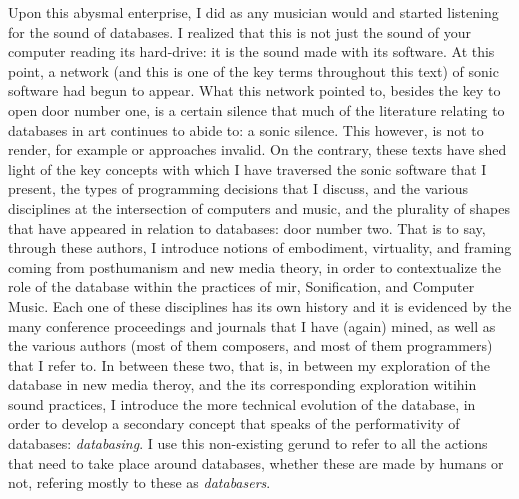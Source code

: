 Upon this abysmal enterprise, I did as any musician would and started listening for the sound of databases. I realized that this is not just the sound of your computer reading its hard-drive: it is the sound made with its software. At this point, a network (and this is one of the key terms throughout this text) of sonic software had begun to appear. What this network pointed to, besides the key to open door number one, is a certain silence that much of the literature relating to databases in art continues to abide to: a sonic silence. This however, is not to render, for example  or  approaches invalid. On the contrary, these texts have shed light of the key concepts with which I have traversed the sonic software that I present, the types of programming decisions that I discuss, and the various disciplines at the intersection of computers and music, and the plurality of shapes that have appeared in relation to databases: door number two. That is to say, through these authors, I introduce notions of embodiment, virtuality, and framing coming from  posthumanism and  new media theory, in order to contextualize the role of the database within the practices of \gls{mir}, Sonification, and Computer Music. Each one of these disciplines has its own history and it is evidenced by the many conference proceedings and journals that I have (again) mined, as well as the various authors (most of them composers, and most of them programmers) that I refer to. In between these two, that is, in between my exploration of the database in new media theroy, and the its corresponding exploration witihin sound practices, I introduce the more technical evolution of the database, in order to develop a secondary concept that speaks of the performativity of databases: \textit{databasing}. I use this non-existing gerund to refer to all the actions that need to take place around databases, whether these are made by humans or not, refering mostly to these as \textit{databasers}.

